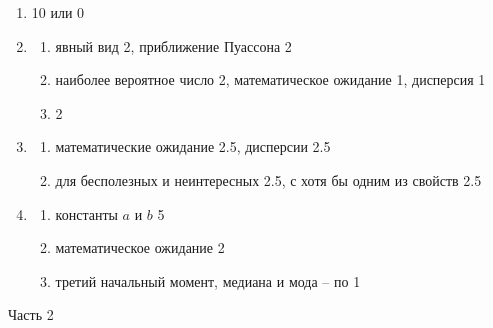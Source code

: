 \documentclass[12pt, a4paper]{article}\usepackage[]{graphicx}\usepackage[]{color}
\begin{document}
\begin{enumerate}
					\item 10 или 0

					\item
					\begin{enumerate}
						\item явный вид 2, приближение Пуассона 2
						\item наиболее вероятное число 2, математическое ожидание 1, дисперсия 1
						\item 2
					\end{enumerate}

					\item
					\begin{enumerate}
						\item математические ожидание 2.5, дисперсии 2.5
						\item для бесполезных и неинтересных 2.5, с хотя бы одним из свойств 2.5

					\end{enumerate}

					\item
					\begin{enumerate}
						\item константы $a$ и $b$ 5
						\item математическое ожидание 2
						\item третий начальный момент, медиана и мода -- по 1
					\end{enumerate}
				\end{enumerate}

				Часть 2
\end{document}
